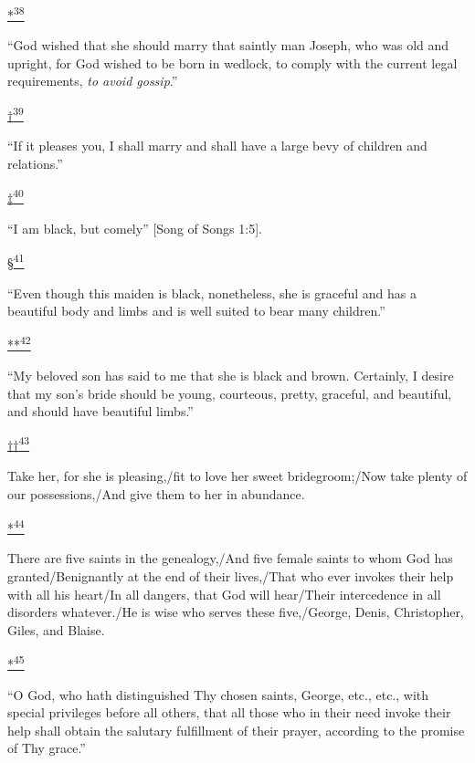 \protect\hypertarget{23_NOTES.xhtmlux5cux23id_3166}{\protect\hyperlink{13_Chapter_Six__THE_DEPICTION_OF_TH.xhtmlux5cux23id_3165}{*\textsuperscript{38}}}
``God wished that she should marry that saintly man Joseph, who was old
and upright, for God wished to be born in wedlock, to comply with the
current legal requirements, \emph{to avoid gossip}.''

\protect\hypertarget{23_NOTES.xhtmlux5cux23id_3168}{\protect\hyperlink{13_Chapter_Six__THE_DEPICTION_OF_TH.xhtmlux5cux23id_3167}{†\textsuperscript{39}}}
``If it pleases you, I shall marry and shall have a large bevy of
children and relations.''

\protect\hypertarget{23_NOTES.xhtmlux5cux23id_3170}{\protect\hyperlink{13_Chapter_Six__THE_DEPICTION_OF_TH.xhtmlux5cux23id_3169}{‡\textsuperscript{40}}}
``I am black, but comely'' {[}Song of Songs 1:5{]}.

\protect\hypertarget{23_NOTES.xhtmlux5cux23id_3172}{\protect\hyperlink{13_Chapter_Six__THE_DEPICTION_OF_TH.xhtmlux5cux23id_3171}{§\textsuperscript{41}}}
``Even though this maiden is black, nonetheless, she is graceful and has
a beautiful body and limbs and is well suited to bear many children.''

\protect\hypertarget{23_NOTES.xhtmlux5cux23id_3174}{\protect\hyperlink{13_Chapter_Six__THE_DEPICTION_OF_TH.xhtmlux5cux23id_3173}{**\textsuperscript{42}}}
``My beloved son has said to me that she is black and brown. Certainly,
I desire that my son's bride should be young, courteous, pretty,
graceful, and beautiful, and should have beautiful limbs.''

\protect\hypertarget{23_NOTES.xhtmlux5cux23id_3176}{\protect\hyperlink{13_Chapter_Six__THE_DEPICTION_OF_TH.xhtmlux5cux23id_3175}{††\textsuperscript{43}}}
Take her, for she is pleasing,/fit to love her sweet bridegroom;/Now
take plenty of our possessions,/And give them to her in abundance.

\protect\hypertarget{23_NOTES.xhtmlux5cux23id_3064}{\protect\hyperlink{13_Chapter_Six__THE_DEPICTION_OF_TH.xhtmlux5cux23id_3063}{*\textsuperscript{44}}}
There are five saints in the genealogy,/And five female saints to whom
God has granted/Benignantly at the end of their lives,/That who ever
invokes their help with all his heart/In all dangers, that God will
hear/Their intercedence in all disorders whatever./He is wise who serves
these five,/George, Denis, Christopher, Giles, and Blaise.

\protect\hypertarget{23_NOTES.xhtmlux5cux23id_3066}{\protect\hyperlink{13_Chapter_Six__THE_DEPICTION_OF_TH.xhtmlux5cux23id_3065}{*\textsuperscript{45}}}
``O God, who hath distinguished Thy chosen saints, George, etc., etc.,
with special privileges before all others, that all those who in their
need invoke their help shall obtain the salutary fulfillment of their
prayer, according to the promise of Thy grace.''

